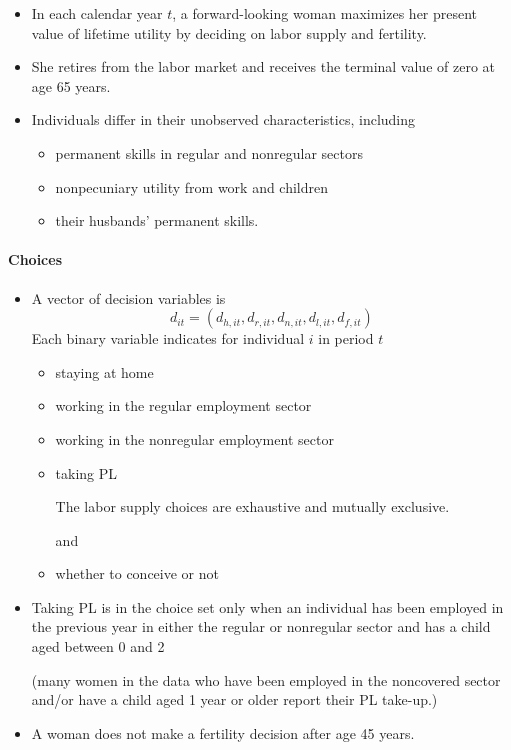 \documentclass[../root]{subfiles}
\begin{document}
    \begin{itemize}
      \item In each calendar year $t$, a forward-looking woman maximizes her present value of lifetime utility by deciding on labor supply and fertility.
      \item She retires from the labor market and receives the terminal value of zero at age 65 years.
      \item Individuals differ in their unobserved characteristics, including
      \begin{itemize}
        \item permanent skills in regular and nonregular sectors
        \item nonpecuniary utility from work and children
        \item their husbands’ permanent skills.
      \end{itemize}
    \end{itemize}

    \paragraph{Choices}

    \begin{itemize}
      \item A vector of decision variables is
      \[
      d_{it} = (d_{h, it}, d_{r, it}, d_{n, it}, d_{l, it}, d_{f, it})
      \]
      Each binary variable indicates for individual $i$ in period $t$
      \begin{itemize}
        \item staying at home
        \item working in the regular employment sector
        \item working in the nonregular employment sector
        \item taking PL

        The labor supply choices are exhaustive and mutually exclusive.

        and
        \item whether to conceive or not
      \end{itemize}
      \item Taking PL is in the choice set only when an individual has been employed in the previous year in either the regular or nonregular sector and has a child aged between 0 and 2

      (many women in the data who have been employed in the noncovered sector and/or have a child aged 1 year or older report their PL take-up.)
      \item A woman does not make a fertility decision after age 45 years.
    \end{itemize}
\end{document}
